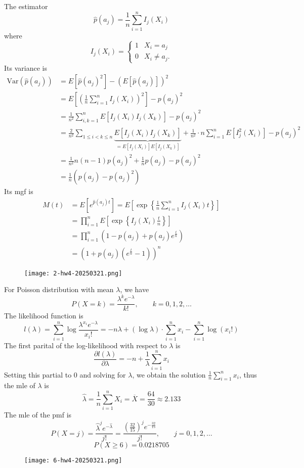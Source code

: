 The estimator
\[
\widehat{p}(a_j)=\frac{1}{n}\sum_{i=1}^{n} I_j(X_i)
\]
where
\[
I_j(X_i)=\begin{cases}
1 & X_i=a_j \\
0 & X_i\neq a_j.
\end{cases}
\]
Its variance is
\[
\begin{aligned}
\mathrm{Var}(\widehat{p}(a_j)) & =E[\widehat{p}(a_j)^{2}]-(E[\widehat{p}(a_j)])^{2} \\
 & =E\left[ \left( \frac{1}{n}\sum_{i=1}^{n} I_j(X_i) \right)^{2} \right]-p(a_j)^{2} \\
 & =\frac{1}{n^{2}}\sum_{i,k=1}^{n} E[I_j(X_i)I_j(X_k)]-p(a_j)^{2} \\
 & =\frac{2}{n^{2}}\sum_{1\leq i<k\leq n}\underbrace{ E[I_j(X_i)I_j(X_k)] }_{ =E[I_j(X_i)]E[I_j(X_k)] }+\frac{1}{n^{2}}\cdot n\sum_{i=1}^{n} E[I^{2}_j(X_i)]-p(a_j)^{2} \\
 & =\frac{1}{n^{2}}n(n-1) p(a_j)^{2}+\frac{1}{n}p(a_j)-p(a_j)^{2} \\
 & =\frac{1}{n}(p(a_j)-p(a_j)^{2})
\end{aligned}
\]
Its mgf is
\[
\begin{aligned}
M(t) & =E[e^{ \widehat{p}(a_j)t }]=E\left[ \exp \left\{  \frac{1}{n}\sum_{i=1}^{n} I_j(X_i)t  \right\} \right] \\
 & =\prod_{i=1}^{n} E\left[ \exp \left\{  I_j(X_i)\frac{t}{n}  \right\} \right]   \\
 & =\prod_{i=1}^{n} \left( 1-p(a_j)+p(a_j)e^{ \frac{t}{n} } \right) \\
 & =(1+p(a_j)(e^{ \frac{t}{n} }-1))^{n}
\end{aligned}
\]
\begin{figure}[H]
\centering
\texttt{[image: 2-hw4-20250321.png]}
\label{}
\end{figure}

For Poisson distribution with mean $\lambda$, we have
\[
P(X=k)=\frac{\lambda^{k}e^{ -\lambda }}{k!},\qquad k=0,1,2,\dots
\]
The likelihood function is
\[
l(\lambda)=\sum_{i=1}^{n} \log\frac{\lambda^{x_i}e^{ -\lambda }}{x_i!}=-n\lambda+(\log\lambda)\cdot \sum_{i=1}^{n} x_i-\sum_{i=1}^{n} \log (x_i!)
\]
The first parital of the log-likelihood with respect to $\lambda$ is
\[
\frac{ \partial l(\lambda) }{ \partial \lambda } =-n+\frac{1}{\lambda}\sum_{i=1}^{n} x_i
\]
Setting this partial to 0 and solving for $\lambda$, we obtain the solution $\frac{1}{n}\sum_{i=1}^{n}x_i$, thus the mle of $\lambda$ is
\[
\widehat{\lambda}=\frac{1}{n}\sum_{i=1}^{n} X_i=\overline{X}=\frac{64}{30}\approx2.133
\]
The mle of the pmf is
\[
P(X=j)=\frac{\widehat{\lambda}^{j}e^{ -\widehat{\lambda} }}{j!}=\frac{\left( \frac{32}{15}  \right)^{j}e^{ -\frac{32}{15}  }}{j!},\qquad j=0,1,2,\dots
\]
\[
P(X\geq 6)=0.0218705
\]
\begin{figure}[H]
\centering
\texttt{[image: 6-hw4-20250321.png]}
\label{}
\end{figure}

